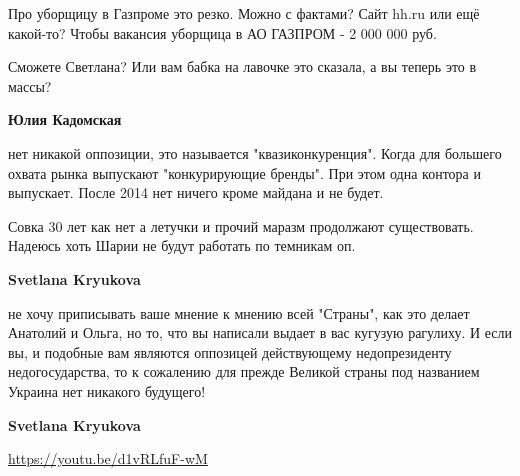 \begin{itemize}
\begin{itemize}
Про уборщицу в Газпроме это резко. Можно с фактами? Сайт hh.ru или ещё
какой-то? Чтобы вакансия уборщица в АО ГАЗПРОМ - 2 000 000 руб. 

Сможете Светлана? Или вам бабка на лавочке это сказала, а вы теперь это в
массы?


 
\textbf{Юлия Кадомская} 

нет никакой оппозиции, это называется "квазиконкуренция". Когда для большего
охвата рынка выпускают "конкурирующие бренды". При этом одна контора и
выпускает. После 2014 нет ничего кроме майдана и не будет.


 

Совка 30 лет как нет а летучки и прочий маразм продолжают существовать. Надеюсь
хоть Шарии не будут работать по темникам оп.

 
\textbf{Svetlana Kryukova} 

не хочу приписывать ваше мнение к мнению всей "Страны", как это делает Анатолий
и Ольга, но то, что вы написали выдает в вас кугузую рагулиху. И если вы, и
подобные вам являются оппозицей действующему недопрезиденту недогосударства, то
к сожалению для прежде Великой страны под названием Украина нет никакого
будущего!

 
\textbf{Svetlana Kryukova} 

\url{https://youtu.be/d1vRLfuF-wM}

 

\end{itemize}
\end{itemize}
